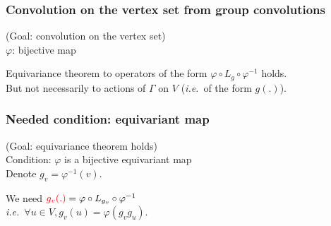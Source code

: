 \documentclass[t,9pt,pdftex]{beamer}
\theoremstyle{definition}
\newcommand{\cs}{\mathcal{S}}
\newcommand{\ie}{\emph{i.e.}~}
\begin{document}
\begin{frame}[c, label=current]
  \frametitle{Convolution on the vertex set from group convolutions}
  (Goal: convolution on the vertex set)\\
  $\varphi$: bijective map
    \begin{figure}
    \scalebox{1.9}
    {}
    \end{figure}
    Equivariance theorem to operators of the form $\varphi \circ L_g \circ \varphi^{-1}$ holds.\\
    But not necessarily to actions of $\Gamma$ on $V$ (\ie of the form $g(.)$).
\end{frame}

\begin{frame}[c, label=current]
  \frametitle{Needed condition: equivariant map}
  (Goal: equivariance theorem holds)\\
  Condition: $\varphi$ is a bijective equivariant map\\
  Denote $g_v = \varphi^{-1}(v)$.
    \begin{figure}
    \scalebox{2.}
    {
}
    \end{figure}
    We need $\textcolor{red}{g_v(.)} = \varphi \circ L_{g_v} \circ \varphi^{-1}$\\
    \ie $\forall u \in V, g_v(u) = \varphi(g_v g_u)$.
\end{frame}
\end{document}
